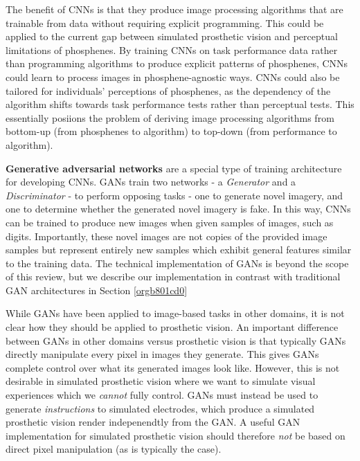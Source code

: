 \documentclass[a4paper,11pt,openany]{book}
\begin{document}
The benefit of CNNs is that they produce image processing algorithms that are trainable from data without requiring explicit programming.
This could be applied to the current gap between simulated prosthetic vision and perceptual limitations of phosphenes.
By training CNNs on task performance data rather than programming algorithms to produce explicit patterns of phosphenes, CNNs could learn to process images in phosphene-agnostic ways.
CNNs could also be tailored for individuals' perceptions of phosphenes, as the dependency of the algorithm shifts towards task performance tests rather than perceptual tests.
This essentially posiions the problem of deriving image processing algorithms from bottom-up (from phosphenes to algorithm) to top-down (from performance to algorithm).

\textbf{Generative adversarial networks} are a special type of training architecture for developing CNNs. \cite{NIPS2014_5423}
GANs train two networks - a \emph{Generator} and a \emph{Discriminator} - to perform opposing tasks - one to generate novel imagery, and one to determine whether the generated novel imagery is fake.
In this way, CNNs can be trained to produce new images when given samples of images, such as digits. \cite{1511.06390,1611.01673,1411.1784}
Importantly, these novel images are not copies of the provided image samples but represent entirely new samples which exhibit general features similar to the training data.
The technical implementation of GANs is beyond the scope of this review, but we describe our implementation in contrast with traditional GAN architectures in Section \ref{orgb801cd0}

While GANs have been applied to image-based tasks in other domains, it is not clear how they should be applied to prosthetic vision.
An important difference between GANs in other domains versus prosthetic vision is that typically GANs directly manipulate every pixel in images they generate. \cite{NIPS2014_5423}
This gives GANs complete control over what its generated images look like.
However, this is not desirable in simulated prosthetic vision where we want to simulate visual experiences which we \emph{cannot} fully control.
GANs must instead be used to generate \emph{instructions} to simulated electrodes, which produce a simulated prosthetic vision render indepenendtly from the GAN.
A useful GAN implementation for simulated prosthetic vision should therefore \emph{not} be based on direct pixel manipulation (as is typically the case).
\end{document}
